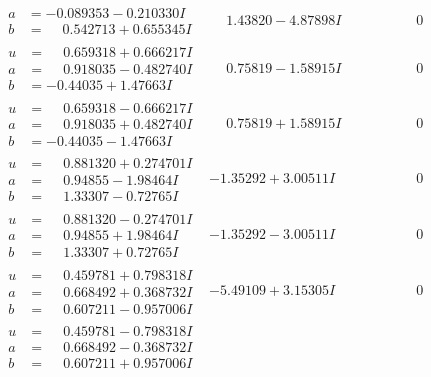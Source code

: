 \documentclass[1p]{elsarticle_modified}
\theoremstyle{definition}
\begin{document}
$$\begin{array}{c|c|c}
\begin{aligned}
a &= -0.089353 - 0.210330 I \\
b &= \phantom{-}0.542713 + 0.655345 I\end{aligned}
 & \phantom{-}1.43820 - 4.87898 I & \phantom{-0.000000 } 0 \\ \hline\begin{aligned}
u &= \phantom{-}0.659318 + 0.666217 I \\
a &= \phantom{-}0.918035 - 0.482740 I \\
b &= -0.44035 + 1.47663 I\end{aligned}
 & \phantom{-}0.75819 - 1.58915 I & \phantom{-0.000000 } 0 \\ \hline\begin{aligned}
u &= \phantom{-}0.659318 - 0.666217 I \\
a &= \phantom{-}0.918035 + 0.482740 I \\
b &= -0.44035 - 1.47663 I\end{aligned}
 & \phantom{-}0.75819 + 1.58915 I & \phantom{-0.000000 } 0 \\ \hline\begin{aligned}
u &= \phantom{-}0.881320 + 0.274701 I \\
a &= \phantom{-}0.94855 - 1.98464 I \\
b &= \phantom{-}1.33307 - 0.72765 I\end{aligned}
 & -1.35292 + 3.00511 I & \phantom{-0.000000 } 0 \\ \hline\begin{aligned}
u &= \phantom{-}0.881320 - 0.274701 I \\
a &= \phantom{-}0.94855 + 1.98464 I \\
b &= \phantom{-}1.33307 + 0.72765 I\end{aligned}
 & -1.35292 - 3.00511 I & \phantom{-0.000000 } 0 \\ \hline\begin{aligned}
u &= \phantom{-}0.459781 + 0.798318 I \\
a &= \phantom{-}0.668492 + 0.368732 I \\
b &= \phantom{-}0.607211 - 0.957006 I\end{aligned}
 & -5.49109 + 3.15305 I & \phantom{-0.000000 } 0 \\ \hline\begin{aligned}
u &= \phantom{-}0.459781 - 0.798318 I \\
a &= \phantom{-}0.668492 - 0.368732 I \\
b &= \phantom{-}0.607211 + 0.957006 I\end{aligned}

\end{array}$$
\end{document}
